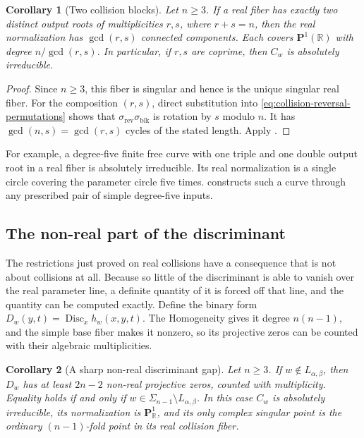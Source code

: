 \documentclass[12pt,reqno]{amsart}
\newtheorem{corollary}[corollary]{Corollary}
\theoremstyle{definition}
\theoremstyle{remark}
\newcommand{\R}{\mathbb R}
\begin{document}
\begin{corollary}[Two collision blocks]
\label{cor:two-block-collision-irreducibility}
Let \(n\geq3\).  If a real fiber has exactly two distinct output roots
of multiplicities \(r,s\), where \(r+s=n\), then the real
normalization has \(\gcd(r,s)\) connected components.  Each covers
\(\mathbf P^1(\R)\) with degree \(n/\gcd(r,s)\).  In particular,
if \(r,s\) are coprime, then \(C_w\) is absolutely irreducible.
\end{corollary}

\begin{proof}
Since \(n\geq3\), this fiber is singular and hence is the unique
singular real fiber.  For the composition \((r,s)\), direct
substitution into \eqref{eq:collision-reversal-permutations} shows
that \(\sigma_{\mathrm{rev}}\sigma_{\mathrm{blk}}\) is rotation by \(s\) modulo \(n\).  It has
\(\gcd(n,s)=\gcd(r,s)\) cycles of the stated length.  Apply
.
\end{proof}

For example, a degree-five finite free curve with one triple and one
double output root in a real fiber is absolutely irreducible.  Its real
normalization is a single circle covering the parameter circle five
times.   constructs such a
curve through any prescribed pair of simple degree-five inputs.

\subsection{The non-real part of the discriminant}

The restrictions just proved on real collisions have a consequence that is
not about collisions at all. Because so little of the discriminant is able to vanish over the real parameter line, a definite quantity of it is forced off that line, and the quantity can be computed exactly. Define the binary form \(D_w(y,t)=\operatorname{Disc}_x h_w(x,y,t)\). The Homogeneity gives it degree \(n(n-1)\), and the simple base fiber makes it nonzero, so its projective zeros can be counted with their algebraic multiplicities.

\begin{corollary}[A sharp non-real discriminant gap]
\label{cor:non-real-discriminant-gap}
Let \(n\geq3\).  If \(w\notin L_{\alpha,\beta}\), then \(D_w\)
has at least \(2n-2\) non-real projective zeros, counted with
multiplicity.  Equality holds if and only if
\(w\in\Sigma_{n-1}\setminus L_{\alpha,\beta}\).
In this case \(C_w\) is absolutely irreducible, its normalization is
\(\mathbf P^1_{\R}\), and its only complex singular point is the
ordinary \((n-1)\)-fold point in its real collision fiber.
\end{corollary}
\end{document}
